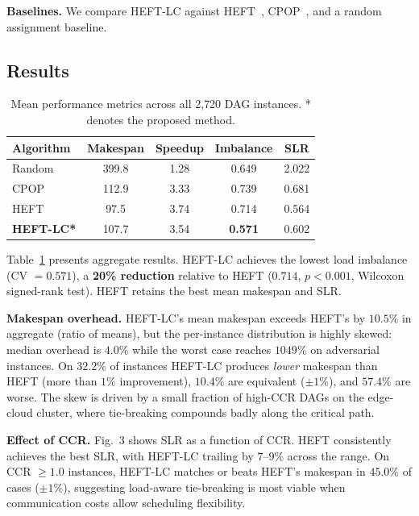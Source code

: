 \documentclass[conference]{IEEEtran}
\begin{document}
\textbf{Baselines.} We compare HEFT-LC against HEFT~\cite{topcuoglu2002},
CPOP~\cite{topcuoglu2002}, and a random assignment baseline.

\subsection{Results}

\begin{table}[h]
\centering
\caption{Mean performance metrics across all 2{,}720 DAG instances.
         * denotes the proposed method.}
\label{tab:results}
\begin{tabular}{lcccc}
\toprule
\textbf{Algorithm} & \textbf{Makespan} & \textbf{Speedup} & \textbf{Imbalance} & \textbf{SLR} \\
\midrule
Random    & 399.8 & 1.28 & 0.649 & 2.022 \\
CPOP      & 112.9 & 3.33 & 0.739 & 0.681 \\
HEFT      &  97.5 & 3.74 & 0.714 & 0.564 \\
\textbf{HEFT-LC*} & 107.7 & 3.54 & \textbf{0.571} & 0.602 \\
\bottomrule
\end{tabular}
\end{table}

Table~\ref{tab:results} presents aggregate results. HEFT-LC achieves
the lowest load imbalance (CV $= 0.571$), a \textbf{20\% reduction}
relative to HEFT ($0.714$, $p < 0.001$, Wilcoxon signed-rank test).
HEFT retains the best mean makespan and SLR.

\textbf{Makespan overhead.} HEFT-LC's mean makespan exceeds HEFT's by
$10.5\%$ in aggregate (ratio of means), but the per-instance
distribution is highly skewed: median overhead is $4.0\%$ while the
worst case reaches $1049\%$ on adversarial instances. On $32.2\%$ of
instances HEFT-LC produces \emph{lower} makespan than HEFT
(more than $1\%$ improvement), $10.4\%$ are equivalent ($\pm 1\%$),
and $57.4\%$ are worse. The skew is driven by a small fraction of
high-CCR DAGs on the edge-cloud cluster, where tie-breaking compounds
badly along the critical path.

\textbf{Effect of CCR.} Fig.~3 shows SLR as a function of CCR.
HEFT consistently achieves the best SLR, with HEFT-LC trailing by
$7$--$9\%$ across the range. On CCR $\geq 1.0$ instances, HEFT-LC
matches or beats HEFT's makespan in $45.0\%$ of cases ($\pm 1\%$),
suggesting load-aware tie-breaking is most viable when communication
costs allow scheduling flexibility.
\end{document}
